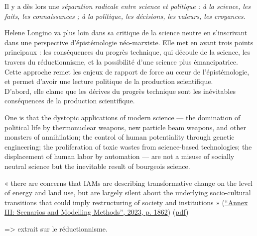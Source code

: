 Il y a dès lors une \emph{séparation radicale entre science et politique : à la science, les faits, les connaissances ; à la politique, les décisions, les valeurs, les croyances}. 


Helene Longino va plus loin dans sa critique de la science neutre en s'inscrivant dans une perspective d'épistémologie néo-marxiste. Elle met en avant trois points principaux : les conséquences du progrès technique, qui découle de la science, les travers du réductionnisme, et la possibilité d'une science plus émancipatrice. Cette approche remet les enjeux de rapport de force au cœur de l'épistémologie, et permet d'avoir une lecture politique de la production scientifique. \\

D'abord, elle clame que les dérives du progrès technique sont les inévitables conséquences de la production scientifique.

\begin{displayquote}
    One is that the dystopic applications of modern science — the domination of political life by thermonuclear weapons, new particle beam weapons, and other monsters of annihilation; the control of human potentiality through genetic engineering; the proliferation of toxic wastes from science-based technologies; the displacement of human labor by automation — are not a misuse of socially neutral science but the inevitable result of bourgeois science.
\end{displayquote}

« there are concerns that IAMs are describing transformative change on the level of energy and land use, but are largely silent about the underlying socio-cultural transitions that could imply restructuring of society and institutions » (\href{zotero://select/library/items/2SDDNUUF}{“Annex III: Scenarios and Modelling Methods”, 2023, p. 1862}) (\href{zotero://open-pdf/library/items/CHVFSLLH?page=22&annotation=JY4VBIZY}{pdf})



=> extrait sur le réductionnisme.

